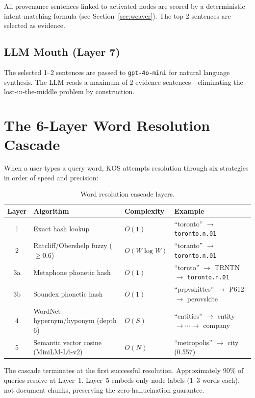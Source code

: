 \documentclass[11pt,a4paper]{article}
\begin{document}
All provenance sentences linked to activated nodes are scored by a deterministic intent-matching formula (see Section~\ref{sec:weaver}). The top 2 sentences are selected as evidence.

\subsection{LLM Mouth (Layer 7)}

The selected 1--2 sentences are passed to \texttt{gpt-4o-mini} for natural language synthesis. The LLM reads a maximum of 2 evidence sentences---eliminating the lost-in-the-middle problem by construction.

\section{The 6-Layer Word Resolution Cascade}
\label{sec:cascade}

When a user types a query word, KOS attempts resolution through six strategies in order of speed and precision:

\begin{table}[ht]
\centering
\caption{Word resolution cascade layers.}
\label{tab:cascade}
\begin{tabular}{@{}clll@{}}
\toprule
\textbf{Layer} & \textbf{Algorithm} & \textbf{Complexity} & \textbf{Example} \\
\midrule
1  & Exact hash lookup            & $O(1)$          & ``toronto'' $\to$ \texttt{toronto.n.01} \\
2  & Ratcliff/Obershelp fuzzy ($\geq 0.6$) & $O(W \log W)$ & ``toranto'' $\to$ \texttt{toronto.n.01} \\
3a & Metaphone phonetic hash      & $O(1)$          & ``tornto'' $\to$ TRNTN $\to$ \texttt{toronto.n.01} \\
3b & Soundex phonetic hash        & $O(1)$          & ``prpvskittes'' $\to$ P612 $\to$ perovskite \\
4  & WordNet hypernym/hyponym (depth 6) & $O(S)$   & ``entities'' $\to$ entity $\to \cdots \to$ company \\
5  & Semantic vector cosine (MiniLM-L6-v2) & $O(N)$ & ``metropolis'' $\to$ city (0.557) \\
\bottomrule
\end{tabular}
\end{table}

The cascade terminates at the first successful resolution. Approximately 90\% of queries resolve at Layer~1. Layer~5 embeds only node labels (1--3 words each), not document chunks, preserving the zero-hallucination guarantee.
\end{document}
